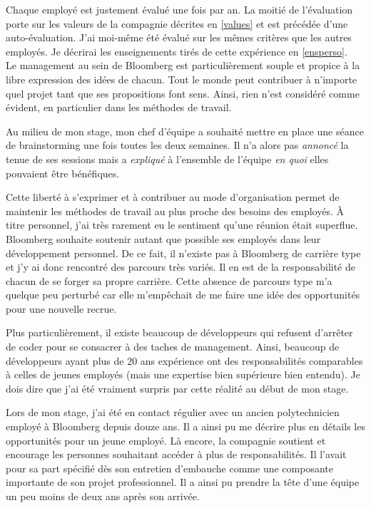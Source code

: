 \documentclass[11pt, oneside, titlepage, a4paper]{article}
\begin{document}
Chaque employé est justement évalué une fois par an. La moitié de l'évaluation porte sur les valeurs de la compagnie décrites en \ref{values} et est précédée d'une auto-évaluation. J'ai moi-même été évalué sur les mêmes critères que les autres employés. Je décrirai les enseignements tirés de cette expérience en \ref{ensperso}.
\\

Le management au sein de Bloomberg est particulièrement souple et propice à la libre expression des idées de chacun. Tout le monde peut contribuer à n'importe quel projet tant que ses propositions font sens. Ainsi, rien n'est considéré comme évident, en particulier dans les méthodes de travail.

Au milieu de mon stage, mon chef d'équipe a souhaité mettre en place une séance de brainstorming une fois toutes les deux semaines. Il n'a alors pas \textit{annoncé} la tenue de ses sessions mais a \textit{expliqué} à l'ensemble de l'équipe \textit{en quoi} elles pouvaient être bénéfiques.

Cette liberté à s'exprimer et à contribuer au mode d'organisation permet de maintenir les méthodes de travail au plus proche des besoins des employés. À titre personnel, j'ai très rarement eu le sentiment qu'une réunion était superflue.
\\

Bloomberg souhaite soutenir autant que possible ses employés dans leur développement personnel. De ce fait, il n'existe pas à Bloomberg de carrière type et j'y ai donc rencontré des parcours très variés. Il en est de la responsabilité de chacun de se forger sa propre carrière. Cette absence de parcours type m'a quelque peu perturbé car elle m'empêchait de me faire une idée des opportunités pour une nouvelle recrue.

Plus particulièrement, il existe beaucoup de développeurs qui refusent d'arrêter de coder pour se consacrer à des taches de management. Ainsi, beaucoup de développeurs ayant plus de 20 ans expérience ont des responsabilités comparables à celles de jeunes employés (mais une expertise bien supérieure bien entendu). Je dois dire que j'ai été vraiment surpris par cette réalité au début de mon stage.

Lors de mon stage, j'ai été en contact régulier avec un ancien polytechnicien employé à Bloomberg depuis douze ans. Il a ainsi pu me décrire plus en détails les opportunités pour un jeune employé. Là encore, la compagnie soutient et encourage les personnes souhaitant accéder à plus de responsabilités. Il l'avait pour sa part spécifié dès son entretien d'embauche comme une composante importante de son projet professionnel. Il a ainsi pu prendre la tête d'une équipe un peu moins de deux ans après son arrivée.
\end{document}
